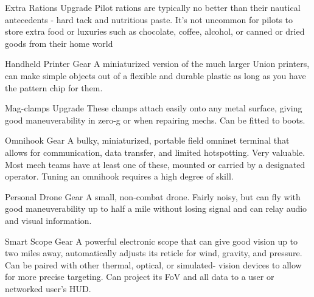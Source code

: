 Extra Rations                 Upgrade        Pilot rations are typically no better than their nautical antecedents
                                             - hard tack and nutritious paste. It’s not uncommon for pilots to
                                             store extra food or luxuries such as chocolate, coffee, alcohol, or
                                             canned or dried goods from their home world

Handheld Printer              Gear           A miniaturized version of the much larger Union printers, can
                                             make simple objects out of a flexible and durable plastic as long
                                             as you have the pattern chip for them.

Mag-clamps                    Upgrade        These clamps attach easily onto any metal surface, giving good
                                             maneuverability in zero-g or when repairing mechs. Can be fitted
                                             to boots.




Omnihook                      Gear           A bulky, miniaturized, portable field omninet terminal that allows
                                             for communication, data transfer, and limited hotspotting. Very
                                             valuable. Most mech teams have at least one of these, mounted
                                             or carried by a designated operator. Tuning an omnihook requires
                                             a high degree of skill.

Personal Drone                Gear           A small, non-combat drone. Fairly noisy, but can fly with good
                                             maneuverability up to half a mile without losing signal and can
                                             relay audio and visual information.

Smart Scope                   Gear           A powerful electronic scope that can give good vision up to two
                                             miles away, automatically adjusts its reticle for wind, gravity, and
                                             pressure. Can be paired with other thermal, optical, or simulated-
                                             vision devices to allow for more precise targeting. Can project its
                                             FoV and all data to a user or networked user’s HUD.

